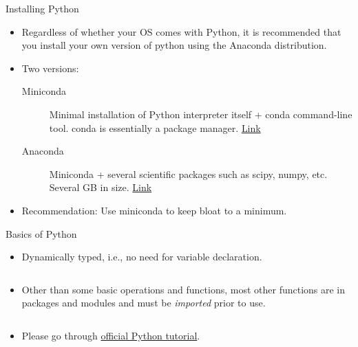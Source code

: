 \documentclass[aspectratio=169]{beamer}
\begin{document}
\begin{frame}{Installing Python}
    \begin{itemize}
        \item Regardless of whether your OS comes with Python, it is recommended that you install your own version of python using the Anaconda distribution.
        \item Two versions:
        \begin{description}
        \item[Miniconda] Minimal installation of Python interpreter itself + conda command-line tool. conda is essentially a package manager. \href{https://docs.conda.io/en/latest/miniconda.html}{Link}
        \item[Anaconda] Miniconda + several scientific packages such as scipy, numpy, etc. Several GB in size. \href{https://www.anaconda.com/distribution/}{Link}
        \end{description}
        \item Recommendation: Use miniconda to keep bloat to a minimum.
    \end{itemize}
\end{frame} 


\begin{frame}[fragile]{Basics of Python}
    \begin{itemize}
        \item Dynamically typed, i.e., no need for variable declaration.
        \inputminted{python}{example_basic_python.py}
        \item Other than some basic operations and functions, most other functions are in packages and modules and must be \textit{imported} prior to use.
        \inputminted{python}{example_imports.py}
        \item Please go through \href{https://docs.python.org/3/tutorial/index.html}{official Python tutorial}.
    \end{itemize}
\end{frame} 
\end{document}
